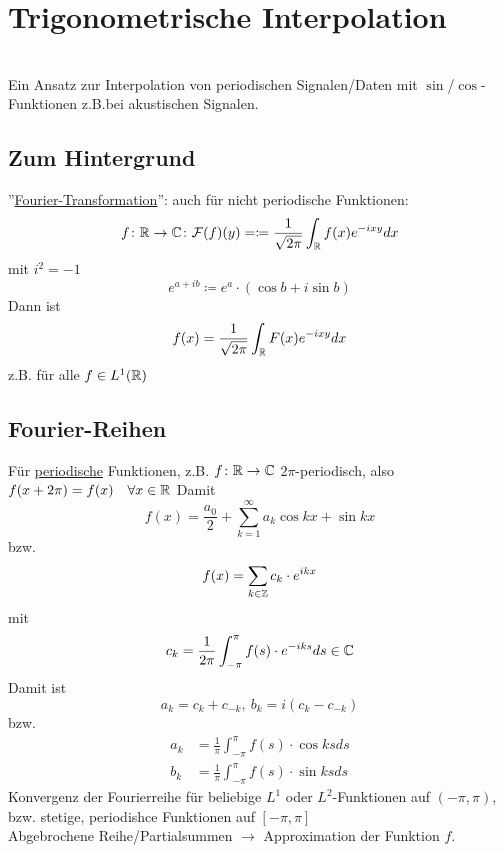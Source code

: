 \section{Trigonometrische Interpolation}\hfill\\
Ein Ansatz zur Interpolation von periodischen Signalen/Daten mit $\sin{}$/$\cos{}$-Funktionen z.B.bei akustischen 
Signalen.\\
\subsection{Zum Hintergrund} ''\underline{Fourier-Transformation}'': auch für nicht periodische Funktionen:
\[
f\colon \mathbb{R} \to \mathbb{C} \colon \mathcal{F}(f)(y)=\coloneqq \frac{1}{\sqrt{2\pi}}\int_{\mathbb{R}} f(x)e^{-ixy} dx
\]
mit $i^2=-1$
\[
e^{a+ib}\coloneqq e^a\cdot(\cos{b}+i\sin{b})
\]
Dann ist
\[
f(x)=\frac{1}{\sqrt{2\pi}}\int_{\mathbb{R}} F(x)e^{-ixy} dx
\]
z.B. für alle $f\in L^1 (\mathbb{R})$\\
\subsection{Fourier-Reihen}
Für \underline{periodische} Funktionen, z.B. \(f\colon\mathbb{R}\to\mathbb{C}\) \(2\pi\)-periodisch, also \(f(x+2\pi)=f(x)\quad \forall x \in \mathbb{R}\)
Damit\[
f(x)=\frac{a_0}{2}+\sum^\infty_{k=1}a_k\cos{kx}+\sin{kx}
\]
bzw.\[
f(x)=\sum_{k\in\mathbb{Z}}c_k\cdot e^{ikx}
\]
mit\[
c_k=\frac{1}{2\pi}\int_{-\pi}^\pi f(s)\cdot e^{-iks}ds\in \mathbb{C} 
\]
Damit ist\[
a_k=c_k+c_{-k},\ b_k=i(c_k-c_{-k})
\]
bzw.
\begin{align*}
  a_k&=\frac{1}{\pi}\int_{-\pi}^\pi f(s)\cdot \cos{ks}ds \\
  b_k&=\frac{1}{\pi}\int_{-\pi}^\pi f(s)\cdot \sin{ks}ds
\end{align*}
Konvergenz der Fourierreihe für beliebige \(L^1\) oder \(L^2\)-Funktionen auf \((-\pi,\pi)\), bzw. stetige, periodishce 
Funktionen auf \([-\pi,\pi]\)\\
Abgebrochene Reihe/Partialsummen $\to$ Approximation der Funktion $f$.
